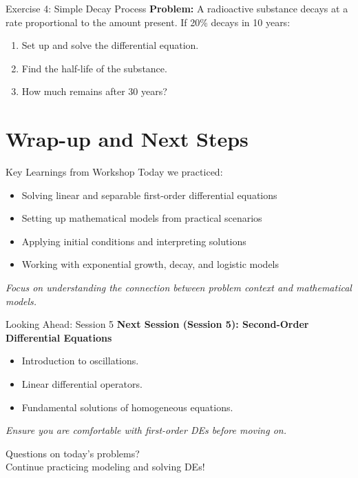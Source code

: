 \documentclass[10pt,aspectratio=169]{beamer}
\newcommand{\concept}[1]{\textbf{#1}}
\newcommand{\emphasis}[1]{\textit{#1}}
\begin{document}
\begin{frame}{Exercise 4: Simple Decay Process}
    \concept{Problem:} A radioactive substance decays at a rate proportional to the amount present. If 20\% decays in 10 years:
    \begin{enumerate}
        \item Set up and solve the differential equation.
        \item Find the half-life of the substance.
        \item How much remains after 30 years?
    \end{enumerate}
\end{frame}

\section{Wrap-up and Next Steps}
\begin{frame}{Key Learnings from Workshop}
    Today we practiced:
    \begin{itemize}
        \item Solving linear and separable first-order differential equations
        \item Setting up mathematical models from practical scenarios
        \item Applying initial conditions and interpreting solutions
        \item Working with exponential growth, decay, and logistic models
    \end{itemize}
    \emphasis{Focus on understanding the connection between problem context and mathematical models.}
\end{frame}

\begin{frame}{Looking Ahead: Session 5}
    \textbf{Next Session (Session 5): Second-Order Differential Equations}
    \begin{itemize}
        \item Introduction to oscillations.
        \item Linear differential operators.
        \item Fundamental solutions of homogeneous equations.
    \end{itemize}
    \emphasis{Ensure you are comfortable with first-order DEs before moving on.}
\end{frame}

\begin{frame}[standout]
    Questions on today's problems? \\
    Continue practicing modeling and solving DEs!
\end{frame}
\end{document}
